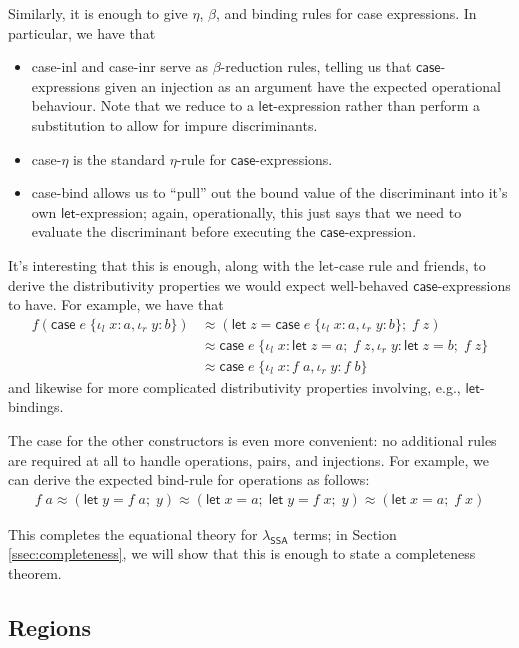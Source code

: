 \documentclass[acmsmall,screen,review]{acmart}
\newcommand{\ms}[1]{\ensuremath{\mathsf{#1}}}
\newcommand{\lto}{:}
\newcommand{\linl}[1]{\iota_l\;{#1}}
\newcommand{\linr}[1]{\iota_r\;{#1}}
\newcommand{\letexpr}[3]{\ensuremath{\ms{let}\;#1 = #2;\;#3}}
\newcommand{\caseexpr}[5]{\ms{case}\;#1\;\{\linl{#2} \lto #3, \linr{#4} \lto #5\}}
\newcommand{\teqv}{\approx}
\newcommand{\brle}[1]{{\textsf{#1}}}
\newcommand{\isotopessa}{\(\lambda_{\ms{SSA}}\)}
\begin{document}
Similarly, it is enough to give $\eta$, $\beta$, and binding rules for \brle{case} expressions. 
In particular, we have that
\begin{itemize}
  \item \brle{case-inl} and \brle{case-inr} serve as $\beta$-reduction rules, telling us that
  \ms{case}-expressions given an injection as an argument have the expected operational behaviour.
  Note that we reduce to a \ms{let}-expression rather than perform a substitution to allow for
  impure discriminants.
  \item \brle{case-$\eta$} is the standard $\eta$-rule for \ms{case}-expressions.
  \item \brle{case-bind} allows us to ``pull'' out the bound value of the discriminant into
  it's own \ms{let}-expression; again, operationally, this just says that we need to evaluate
  the discriminant before executing the \ms{case}-expression.
\end{itemize}
It's interesting that this is enough, along with the \brle{let-case} rule and friends, to derive the
distributivity properties we would expect well-behaved \ms{case}-expressions to have. For example,
we have that
\begin{align*}
  f(\caseexpr{e}{x}{a}{y}{b}) 
  &\teqv (\letexpr{z}{\caseexpr{e}{x}{a}{y}{b}}{f\;z}) \\
  &\teqv \caseexpr{e}{x}{\letexpr{z}{a}{f\;z}}{y}{\letexpr{z}{b}{f\;z}} \\
  &\teqv \caseexpr{e}{x}{f\;a}{y}{f\;b}
\end{align*}
and likewise for more complicated distributivity properties involving, e.g., \ms{let}-bindings.

The case for the other constructors is even more convenient: no additional rules are required
at all to handle operations, pairs, and injections. For example, we can derive the expected
bind-rule for operations as follows:
\begin{align*}
  f\;a \teqv (\letexpr{y}{f\;a}{y})
  \teqv (\letexpr{x}{a}{\letexpr{y}{f\;x}{y}})
  \teqv (\letexpr{x}{a}{f\;x})
\end{align*}

This completes the equational theory for \isotopessa{} terms; in Section \ref{ssec:completeness}, we
will show that this is enough to state a completeness theorem.

\subsection{Regions}
\end{document}
